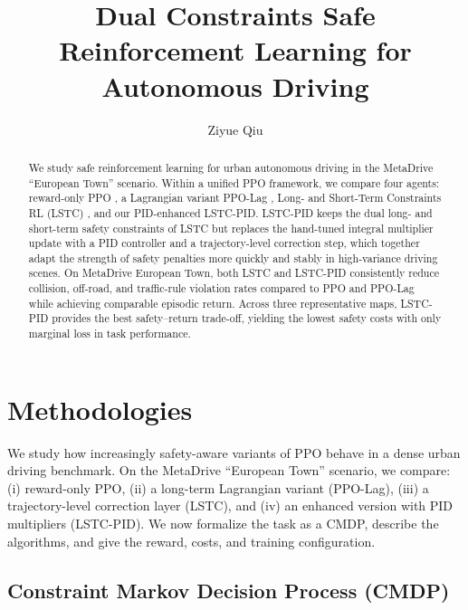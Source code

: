 \documentclass[11pt]{article}
\title{Dual Constraints Safe Reinforcement Learning for Autonomous Driving}
\author{Ziyue Qiu\\\text{ziyueqiu@mit.edu}}
\date{}
\begin{document}
\maketitle

\begin{abstract}
We study safe reinforcement learning for urban autonomous driving in the MetaDrive ``European Town'' scenario.
Within a unified PPO framework, we compare four agents: reward-only PPO \cite{schulman2017ppo}, a Lagrangian variant PPO-Lag \cite{ray2019safexp}, Long- and Short-Term Constraints RL (LSTC) \cite{hu2024lstc}, and our PID-enhanced LSTC-PID.
LSTC-PID keeps the dual long- and short-term safety constraints of LSTC but replaces the hand-tuned integral multiplier update with a PID controller and a trajectory-level correction step, which together adapt the strength of safety penalties more quickly and stably in high-variance driving scenes.
On MetaDrive European Town, both LSTC and LSTC-PID consistently reduce collision, off-road, and traffic-rule violation rates compared to PPO and PPO-Lag while achieving comparable episodic return.
Across three representative maps, LSTC-PID provides the best safety--return trade-off, yielding the lowest safety costs with only marginal loss in task performance.
\end{abstract}


\section{Methodologies}
\label{sec:setup}

We study how increasingly safety-aware variants of PPO behave in a dense urban driving benchmark.
On the MetaDrive ``European Town'' scenario, we compare:
(i) reward-only PPO,
(ii) a long-term Lagrangian variant (PPO-Lag),
(iii) a trajectory-level correction layer (LSTC),
and (iv) an enhanced version with PID multipliers (LSTC-PID).
We now formalize the task as a CMDP, describe the algorithms, and give the reward, costs, and training configuration.

\subsection*{Constraint Markov Decision Process (CMDP)}
\end{document}
